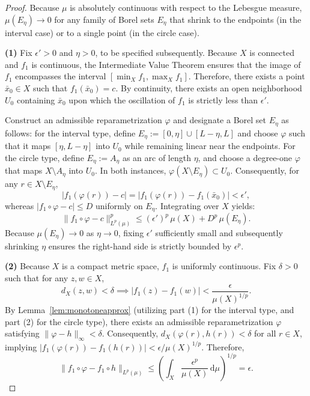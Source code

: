 \documentclass[12pt,a4paper]{amsart}
\theoremstyle{plain}
\theoremstyle{definition}
\theoremstyle{remark}
\begin{document}
\begin{proof}
Because $\mu$ is absolutely continuous with respect to the Lebesgue measure, $\mu(E_\eta) \to 0$ for any family of Borel sets $E_\eta$ that shrink to the endpoints (in the interval case) or to a single point (in the circle case).

\textbf{(1)} Fix $\epsilon' > 0$ and $\eta > 0$, to be specified subsequently. Because $X$ is connected and $f_1$ is continuous, the Intermediate Value Theorem ensures that the image of $f_1$ encompasses the interval $[\min_X f_1, \max_X f_1]$. Therefore, there exists a point $\bar{x}_0 \in X$ such that $f_1(\bar{x}_0) = c$. By continuity, there exists an open neighborhood $U_0$ containing $\bar{x}_0$ upon which the oscillation of $f_1$ is strictly less than $\epsilon'$. 

Construct an admissible reparametrization $\varphi$ and designate a Borel set $E_\eta$ as follows: for the interval type, define $E_\eta := [0,\eta] \cup [L-\eta, L]$ and choose $\varphi$ such that it maps $[\eta, L-\eta]$ into $U_0$ while remaining linear near the endpoints. For the circle type, define $E_\eta := A_\eta$ as an arc of length $\eta$, and choose a degree-one $\varphi$ that maps $X \setminus A_\eta$ into $U_0$. In both instances, $\varphi(X \setminus E_\eta) \subset U_0$. Consequently, for any $r \in X \setminus E_\eta$,
$$|f_1(\varphi(r)) - c| = |f_1(\varphi(r)) - f_1(\bar{x}_0)| < \epsilon',$$
whereas $|f_1 \circ \varphi - c| \le D$ uniformly on $E_\eta$. Integrating over $X$ yields:
$$\|f_1 \circ \varphi - c\|_{L^p(\mu)}^p \le (\epsilon')^p\,\mu(X) + D^p\,\mu(E_\eta).$$
Because $\mu(E_\eta) \to 0$ as $\eta \to 0$, fixing $\epsilon'$ sufficiently small and subsequently shrinking $\eta$ ensures the right-hand side is strictly bounded by $\epsilon^p$.

\textbf{(2)} Because $X$ is a compact metric space, $f_1$ is uniformly continuous. Fix $\delta > 0$ such that for any $z, w \in X$,
$$d_X(z,w) < \delta \implies |f_1(z) - f_1(w)| < \frac{\epsilon}{\mu(X)^{1/p}}.$$
By Lemma~\ref{lem:monotoneapprox} (utilizing part (1) for the interval type, and part (2) for the circle type), there exists an admissible reparametrization $\varphi$ satisfying $\|\varphi - h\|_\infty < \delta$. Consequently, $d_X(\varphi(r), h(r)) < \delta$ for all $r \in X$, implying $|f_1(\varphi(r)) - f_1(h(r))| < \epsilon / \mu(X)^{1/p}$. Therefore,
$$\|f_1 \circ \varphi - f_1 \circ h\|_{L^p(\mu)} \le \left( \int_X \frac{\epsilon^p}{\mu(X)}\,\mathrm{d}\mu \right)^{1/p} = \epsilon.$$
\end{proof}
\end{document}
